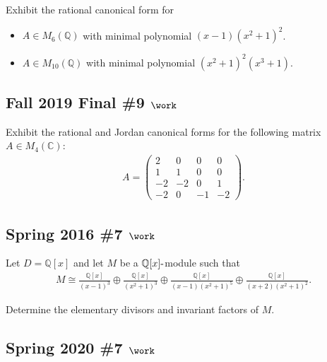 Exhibit the rational canonical form for

\begin{itemize}
\tightlist
\item
  \(A\in M_6({\mathbb{Q}})\) with minimal polynomial
  \((x-1)(x^2 + 1)^2\).
\item
  \(A\in M_{10}({\mathbb{Q}})\) with minimal polynomial
  \((x^2+1)^2(x^3 + 1)\).
\end{itemize}

\hypertarget{fall-2019-final-9-work}{%
\subsection{\texorpdfstring{Fall 2019 Final \#9
\(\work\)}{Fall 2019 Final \#9 \textbackslash work}}\label{fall-2019-final-9-work}}

Exhibit the rational and Jordan canonical forms for the following matrix
\(A\in M_4({\mathbb{C}})\):
\begin{align*}
  A=\left(\begin{array}{cccc}
  2 & 0 & 0 & 0 \\
  1 & 1 & 0 & 0 \\
  -2 & -2 & 0 & 1 \\
  -2 & 0 & -1 & -2
  \end{array}\right)
  .\end{align*}

\hypertarget{spring-2016-7-work}{%
\subsection{\texorpdfstring{Spring 2016 \#7
\(\work\)}{Spring 2016 \#7 \textbackslash work}}\label{spring-2016-7-work}}

Let \(D = {\mathbb{Q}}[x]\) and let \(M\) be a
\({\mathbb{Q}}[x]{\hbox{-}}\)module such that
\begin{align*}
M \cong \frac{\mathbb{Q}[x]}{(x-1)^{3}} \oplus \frac{\mathbb{Q}[x]}{\left(x^{2}+1\right)^{3}} \oplus \frac{\mathbb{Q}[x]}{(x-1)\left(x^{2}+1\right)^{5}} \oplus \frac{\mathbb{Q}[x]}{(x+2)\left(x^{2}+1\right)^{2}}
.\end{align*}

Determine the elementary divisors and invariant factors of \(M\).

\hypertarget{spring-2020-7-work}{%
\subsection{\texorpdfstring{Spring 2020 \#7
\(\work\)}{Spring 2020 \#7 \textbackslash work}}\label{spring-2020-7-work}}

